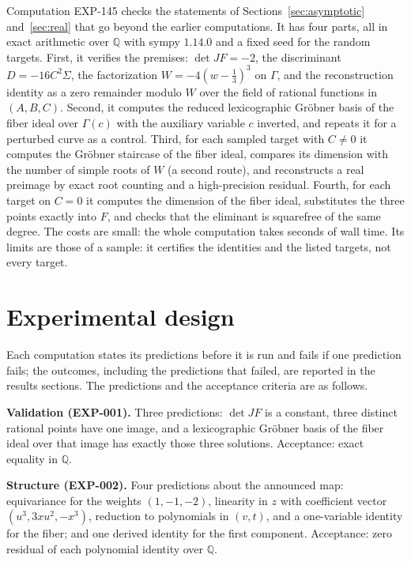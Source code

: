 \documentclass[11pt]{article}
\theoremstyle{definition}
\theoremstyle{remark}
\newcommand{\Q}{\mathbb{Q}}
\begin{document}
Computation EXP-145 checks the statements of Sections~\ref{sec:asymptotic} and~\ref{sec:real} that go beyond the earlier computations. It has four parts, all in exact arithmetic over $\Q$ with sympy $1.14.0$ and a fixed seed for the random targets. First, it verifies the premises: $\det JF = -2$, the discriminant $D = -16C^2\Sigma$, the factorization $W = -4(w - \tfrac13)^3$ on $\Gamma$, and the reconstruction identity as a zero remainder modulo $W$ over the field of rational functions in $(A,B,C)$. Second, it computes the reduced lexicographic Gr\"obner basis of the fiber ideal over $\Gamma(c)$ with the auxiliary variable $c$ inverted, and repeats it for a perturbed curve as a control. Third, for each sampled target with $C \neq 0$ it computes the Gr\"obner staircase of the fiber ideal, compares its dimension with the number of simple roots of $W$ (a second route), and reconstructs a real preimage by exact root counting and a high-precision residual. Fourth, for each target on $C = 0$ it computes the dimension of the fiber ideal, substitutes the three points exactly into $F$, and checks that the eliminant is squarefree of the same degree. The costs are small: the whole computation takes \numExpSeconds{} seconds of wall time. Its limits are those of a sample: it certifies the identities and the listed targets, not every target.

\section{Experimental design}\label{sec:design}

Each computation states its predictions before it is run and fails if one prediction fails; the outcomes, including the predictions that failed, are reported in the results sections. The
predictions and the acceptance criteria are as follows.

\textbf{Validation (EXP-001).} Three predictions: $\det JF$ is a constant, three distinct rational points have one image, and a lexicographic Gr\"obner basis of the fiber ideal over that image has exactly those three solutions. Acceptance: exact equality in $\Q$.

\textbf{Structure (EXP-002).} Four predictions about the announced map: equivariance for the weights $(1,-1,-2)$, linearity in $z$ with coefficient vector $(u^3, 3xu^2, -x^3)$, reduction to polynomials in $(v,t)$, and a one-variable identity for the fiber; and one derived identity for the first component. Acceptance: zero residual of each polynomial identity over $\Q$.
\end{document}
